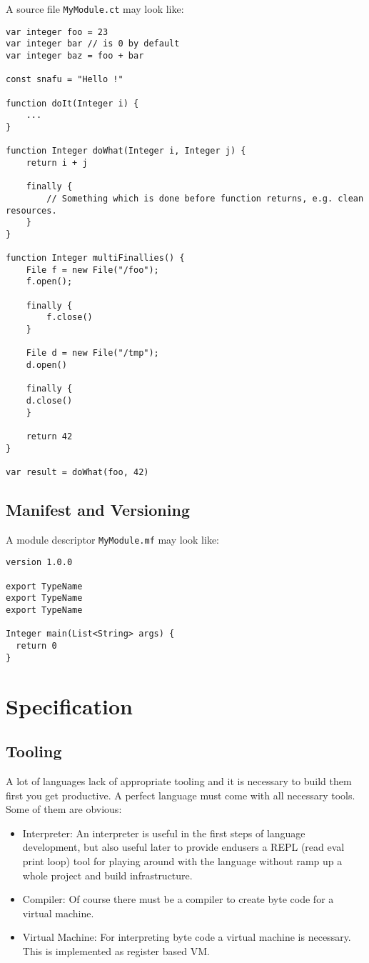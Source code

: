\documentclass[a4paper,12pt]{article}
\begin{document}
A source file \verb|MyModule.ct| may look like:

\begin{verbatim}
var integer foo = 23
var integer bar // is 0 by default
var integer baz = foo + bar

const snafu = "Hello !"

function doIt(Integer i) {
    ...
}

function Integer doWhat(Integer i, Integer j) {
    return i + j
    
    finally {
    	// Something which is done before function returns, e.g. clean resources.
    }
}

function Integer multiFinallies() {
    File f = new File("/foo");
    f.open();
    
    finally {
        f.close()
    }
    
    File d = new File("/tmp");
    d.open()
    
    finally {
    d.close()
    }
    
    return 42
}

var result = doWhat(foo, 42)	
\end{verbatim}

\subsection{Manifest and Versioning}

A module descriptor \verb|MyModule.mf| may look like:

\begin{verbatim}
version 1.0.0

export TypeName
export TypeName
export TypeName

Integer main(List<String> args) {
  return 0
}
\end{verbatim}

\section{Specification}

\subsection{Tooling}

A lot of languages lack of appropriate tooling and it is necessary to build them first you get productive. A perfect language must come with all necessary tools. Some of them are obvious:

\begin{itemize}
	\item Interpreter: An interpreter is useful in the first steps of language development, but also useful later to provide endusers a REPL (read eval print loop) tool for playing around with the language without ramp up a whole project and build infrastructure.
	\item Compiler: Of course there must be a compiler to create byte code for a virtual machine.
	\item Virtual Machine: For interpreting byte code a virtual machine is necessary. This is implemented as register based VM.
\end{itemize}
\end{document}
